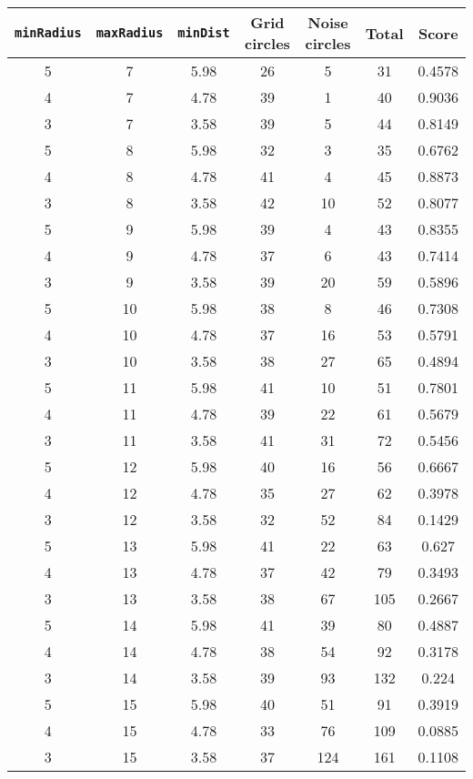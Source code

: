 \documentclass[letterpaper, 12pt]{article}
\begin{document}
\begin{longtable}{|c|c|c|c|c|c|c|}
\hline
\textbf{\texttt{minRadius}} & \textbf{\texttt{maxRadius}} & \textbf{\texttt{minDist}} & \textbf{Grid circles} & \textbf{Noise circles} & \textbf{Total} & \textbf{Score} \\
\hline
5 & 7 & 5.98 & 26 & 5 & 31 & 0.4578 \\
\hline
4 & 7 & 4.78 & 39 & 1 & 40 & 0.9036 \\
\hline
3 & 7 & 3.58 & 39 & 5 & 44 & 0.8149 \\
\hline
5 & 8 & 5.98 & 32 & 3 & 35 & 0.6762 \\
\hline
4 & 8 & 4.78 & 41 & 4 & 45 & 0.8873 \\
\hline
3 & 8 & 3.58 & 42 & 10 & 52 & 0.8077 \\
\hline
5 & 9 & 5.98 & 39 & 4 & 43 & 0.8355 \\
\hline
4 & 9 & 4.78 & 37 & 6 & 43 & 0.7414 \\
\hline
3 & 9 & 3.58 & 39 & 20 & 59 & 0.5896 \\
\hline
5 & 10 & 5.98 & 38 & 8 & 46 & 0.7308 \\
\hline
4 & 10 & 4.78 & 37 & 16 & 53 & 0.5791 \\
\hline
3 & 10 & 3.58 & 38 & 27 & 65 & 0.4894 \\
\hline
5 & 11 & 5.98 & 41 & 10 & 51 & 0.7801 \\
\hline
4 & 11 & 4.78 & 39 & 22 & 61 & 0.5679 \\
\hline
3 & 11 & 3.58 & 41 & 31 & 72 & 0.5456 \\
\hline
5 & 12 & 5.98 & 40 & 16 & 56 & 0.6667 \\
\hline
4 & 12 & 4.78 & 35 & 27 & 62 & 0.3978 \\
\hline
3 & 12 & 3.58 & 32 & 52 & 84 & 0.1429 \\
\hline
5 & 13 & 5.98 & 41 & 22 & 63 & 0.627 \\
\hline
4 & 13 & 4.78 & 37 & 42 & 79 & 0.3493 \\
\hline
3 & 13 & 3.58 & 38 & 67 & 105 & 0.2667 \\
\hline
5 & 14 & 5.98 & 41 & 39 & 80 & 0.4887 \\
\hline
4 & 14 & 4.78 & 38 & 54 & 92 & 0.3178 \\
\hline
3 & 14 & 3.58 & 39 & 93 & 132 & 0.224 \\
\hline
5 & 15 & 5.98 & 40 & 51 & 91 & 0.3919 \\
\hline
4 & 15 & 4.78 & 33 & 76 & 109 & 0.0885 \\
\hline
3 & 15 & 3.58 & 37 & 124 & 161 & 0.1108 \\

\end{longtable}
\end{document}
